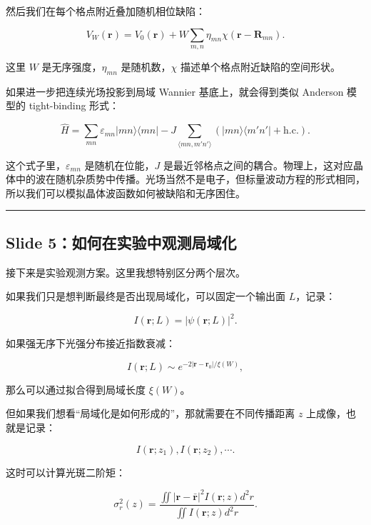 \documentclass[UTF8,fontset=none,12pt]{ctexart}
\begin{document}
然后我们在每个格点附近叠加随机相位缺陷：\par

\[
V_W(\mathbf r)=V_0(\mathbf r)+W\sum_{m,n}\eta_{mn}\chi(\mathbf r-\mathbf R_{mn}).
\]

这里 $W$ 是无序强度，$\eta_{mn}$ 是随机数，$\chi$ 描述单个格点附近缺陷的空间形状。\par

如果进一步把连续光场投影到局域 Wannier 基底上，就会得到类似 Anderson 模型的 tight-binding 形式：\par

\[
\hat H=\sum_{mn}\varepsilon_{mn}|mn\rangle\langle mn|
-J\sum_{\langle mn,m'n'\rangle}
(|mn\rangle\langle m'n'|+\mathrm{h.c.}) .
\]

这个式子里，$\varepsilon_{mn}$ 是随机在位能，$J$ 是最近邻格点之间的耦合。物理上，这对应晶体中的波在随机杂质势中传播。光场当然不是电子，但标量波动方程的形式相同，所以我们可以模拟晶体波函数如何被缺陷和无序困住。\par

\bigskip\hrule\bigskip

\subsection*{Slide 5：如何在实验中观测局域化}

接下来是实验观测方案。这里我想特别区分两个层次。\par

如果我们只是想判断最终是否出现局域化，可以固定一个输出面 $L$，记录：\par

\[
I(\mathbf r;L)=|\psi(\mathbf r;L)|^2 .
\]

如果强无序下光强分布接近指数衰减：\par

\[
I(\mathbf r;L)\sim e^{-2|\mathbf r-\mathbf r_0|/\xi(W)},
\]

那么可以通过拟合得到局域长度 $\xi(W)$。\par

但如果我们想看“局域化是如何形成的”，那就需要在不同传播距离 $z$ 上成像，也就是记录：\par

\[
I(\mathbf r;z_1), I(\mathbf r;z_2),\cdots .
\]

这时可以计算光斑二阶矩：\par

\[
\sigma_r^2(z)=
\frac{\iint |\mathbf r-\bar{\mathbf r}|^2I(\mathbf r;z)d^2r}
{\iint I(\mathbf r;z)d^2r}.
\]
\end{document}
